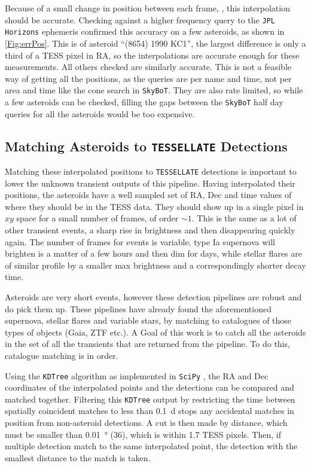 \documentclass{UCreport}
\begin{document}
Because of a small change in position between each frame, \citep[$\sim \qty{1}{\px}$ per \qty{30}{min} frame][]{Pal2018}, this interpolation should be accurate.
Checking against a higher frequency query to the \texttt{JPL Horizons} ephemeris  confirmed this accuracy on a few asteroids, as shown in \autoref{Fig:errPos}.
This is of asteroid ``(8654) 1990 KC1'', the largest difference is only a third of a TESS pixel in RA, so the interpolations are accurate enough for these measurements.
All others checked are similarly accurate.
This is not a feasible way of getting all the positions, as the queries are per name and time, not per area and time like the cone search in \texttt{SkyBoT}.
They are also rate limited, so while a few asteroids can be checked, filling the gaps between the \texttt{SkyBoT} half day queries for all the asteroids would be too expensive.



\subsection{Matching Asteroids to \texttt{TESSELLATE} Detections}\label{SubSec:Match}

Matching these interpolated positions to \texttt{TESSELLATE} detections is important to lower the unknown transient outputs of this pipeline.
Having interpolated their positions, the asteroids have a well sampled set of RA, Dec and time values of where they should be in the TESS data.
They should show up in a single pixel in $xy$ space for a small number of frames, of order $\sim1$.
This is the same as a lot of other transient events, a sharp rise in brightness and then disappearing quickly again.
The number of frames for events is variable, type Ia supernova will brighten is a matter of a few hours and then dim for days, while stellar flares are of similar profile by a smaller max brightness and a correspondingly shorter decay time.

Asteroids are very short events, however these detection pipelines are robust and do pick them up.
These pipelines have already found the aforementioned supernova, stellar flares and variable stars, by matching to catalogues of those types of objects (Gaia, ZTF etc.). %
A Goal of this work is to catch all the asteroids in the set of all the transients that are returned from the pipeline.
To do this, catalogue matching is in order.


Using the \texttt{KDTree} algorithm \citep{Maneewongvatana1999} as implemented in \texttt{SciPy} \citep{2020SciPy-NMeth}, the RA and Dec coordinates of the interpolated points and the detections can be compared and matched together.
Filtering this \texttt{KDTree} output by restricting the time between spatially coincident matches to less than \qty{0.1}{\day} stops any accidental matches in position from non-asteroid detections.
A cut is then made by distance, which must be smaller than \qty{0.01}{\degree} (\qty{36}{\arcsec}), which is within 1.7 TESS pixels.
Then, if multiple detection match to the same interpolated point, the detection with the smallest distance to the match is taken.
\end{document}
